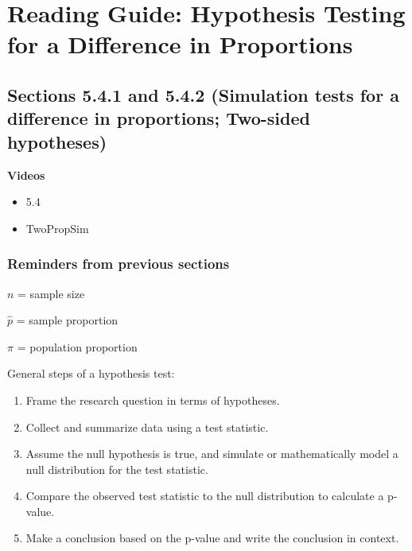 \documentclass[
]{report}
\providecommand{\tightlist}{%
  \setlength{\itemsep}{0pt}\setlength{\parskip}{0pt}}
\begin{document}
\hypertarget{reading-guide-hypothesis-testing-for-a-difference-in-proportions}{%
\section{Reading Guide: Hypothesis Testing for a Difference in Proportions}\label{reading-guide-hypothesis-testing-for-a-difference-in-proportions}}

\hypertarget{sections-5.4.1-and-5.4.2-simulation-tests-for-a-difference-in-proportions-two-sided-hypotheses}{%
\subsection*{Sections 5.4.1 and 5.4.2 (Simulation tests for a difference in proportions; Two-sided hypotheses)}\label{sections-5.4.1-and-5.4.2-simulation-tests-for-a-difference-in-proportions-two-sided-hypotheses}}

\textbf{Videos}

\begin{itemize}
\tightlist
\item
  5.4
\item
  TwoPropSim
\end{itemize}


\hypertarget{reminders-from-previous-sections-2}{%
\subsubsection*{Reminders from previous sections}\label{reminders-from-previous-sections-2}}

\(n\) = sample size

\(\hat{p}\) = sample proportion

\(\pi\) = population proportion

General steps of a hypothesis test:

\begin{enumerate}
\def\labelenumi{\arabic{enumi}.}
\item
  Frame the research question in terms of hypotheses.
\item
  Collect and summarize data using a test statistic.
\item
  Assume the null hypothesis is true, and simulate or mathematically model a null distribution for the test statistic.
\item
  Compare the observed test statistic to the null distribution to calculate a p-value.
\item
  Make a conclusion based on the p-value and write the conclusion in context.
\end{enumerate}
\end{document}

